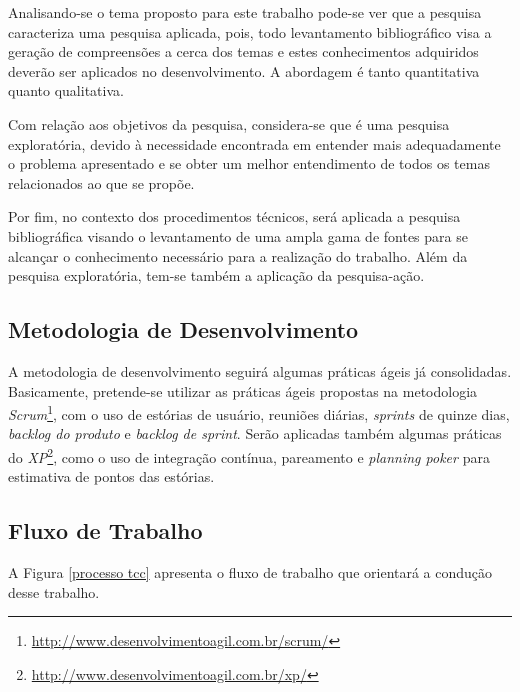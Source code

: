 Analisando-se o tema proposto para este trabalho pode-se ver que a pesquisa caracteriza uma pesquisa aplicada, pois, todo levantamento bibliográfico visa a geração de compreensões a cerca dos temas e estes conhecimentos adquiridos deverão ser aplicados no desenvolvimento. A abordagem é tanto quantitativa quanto qualitativa.

Com relação aos objetivos da pesquisa, considera-se que é uma pesquisa exploratória, devido à necessidade encontrada em entender mais adequadamente o problema apresentado e se obter um melhor entendimento de todos os temas relacionados ao que se propõe.

Por fim, no contexto dos procedimentos técnicos, será aplicada a pesquisa bibliográfica visando o levantamento de uma ampla gama de fontes para se alcançar o conhecimento necessário para a realização do trabalho. Além da pesquisa exploratória, tem-se também a aplicação da pesquisa-ação.


\subsection{Metodologia de Desenvolvimento}

A metodologia de desenvolvimento seguirá algumas práticas ágeis já consolidadas. Basicamente, pretende-se utilizar as práticas ágeis propostas na metodologia \textit{Scrum}\footnote{\url{http://www.desenvolvimentoagil.com.br/scrum/}}, com o uso de estórias de usuário, reuniões diárias, \textit{sprints} de quinze dias, \textit{backlog do produto} e \textit{backlog de sprint}. Serão aplicadas também algumas práticas do \textit{XP}\footnote{\url{http://www.desenvolvimentoagil.com.br/xp/}}, como o uso de integração contínua, pareamento e \textit{planning poker} para estimativa de pontos das estórias.

\subsection{Fluxo de Trabalho}

A Figura \ref{processo tcc} apresenta o fluxo de trabalho que orientará a condução desse trabalho.

